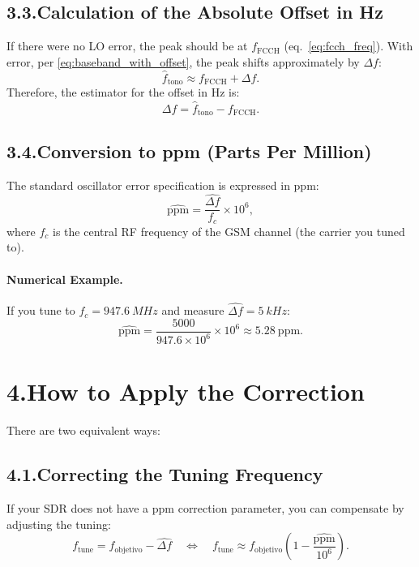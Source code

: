 \documentclass[10pt]{article}
\begin{document}
\subsection*{3.3.\;Calculation of the Absolute Offset in Hz}
If there were no LO error, the peak should be at $f_{\text{FCCH}}$ (eq.~\eqref{eq:fcch_freq}). With error, per \eqref{eq:baseband_with_offset}, the peak shifts approximately by $\Delta f$:
\begin{equation}
\hat f_{\text{tono}} \approx f_{\text{FCCH}} + \Delta f.
\end{equation}
Therefore, the estimator for the offset in Hz is:
\begin{equation}
\widehat{\Delta f} = \hat f_{\text{tono}} - f_{\text{FCCH}}.
\label{eq:delta_f_hat}
\end{equation}

\subsection*{3.4.\;Conversion to ppm (Parts Per Million)}
The standard oscillator error specification is expressed in ppm:
\begin{equation}
\widehat{\text{ppm}} = \frac{\widehat{\Delta f}}{f_c}\times 10^6,
\label{eq:ppm}
\end{equation}
where $f_c$ is the central RF frequency of the GSM channel (the carrier you tuned to).

\paragraph{Numerical Example.}
If you tune to $f_c=\SI{947.6}{MHz}$ and measure $\widehat{\Delta f}=\SI{5}{kHz}$:
\[
\widehat{\text{ppm}}=\frac{5000}{947.6\times 10^6}\times 10^6\approx 5.28\ \text{ppm}.
\]

\section*{4.\;How to Apply the Correction}
There are two equivalent ways:

\subsection*{4.1.\;Correcting the Tuning Frequency}
If your SDR does not have a ppm correction parameter, you can compensate by adjusting the tuning:
\begin{equation}
f_{\text{tune}} = f_{\text{objetivo}} - \widehat{\Delta f}
\quad\Longleftrightarrow\quad
f_{\text{tune}} \approx f_{\text{objetivo}}\left(1-\frac{\widehat{\text{ppm}}}{10^6}\right).
\end{equation}
\end{document}
